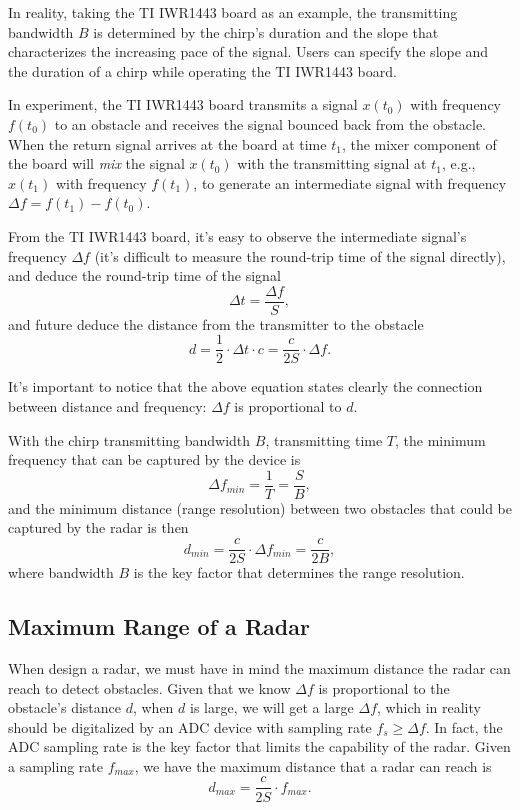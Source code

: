 \documentclass[11pt, oneside]{article}   	%
\begin{document}
In reality, taking the TI IWR1443 board as an example, the transmitting bandwidth $B$ is determined by the chirp's duration and the slope that characterizes the increasing pace of the signal. Users can specify the slope and the duration of a chirp while operating the TI IWR1443 board.

In experiment, the TI IWR1443 board transmits a signal $x(t_0)$ with frequency $f(t_0)$ to an obstacle and receives the signal bounced back from the obstacle. When the return signal arrives at the board at time $t_1$, the mixer component of the board will \emph{mix} the signal $x(t_0)$ with the transmitting signal at $t_1$, e.g., $x(t_1)$ with frequency $f(t_1)$, to generate an intermediate signal with frequency $\Delta f = f(t_1) - f(t_0)$. 

From the TI IWR1443 board, it's easy to observe the intermediate signal's frequency $\Delta f$ (it's difficult to measure the round-trip time of the signal directly), and deduce the round-trip time of the signal 
$$\Delta t = \frac{\Delta f}{S},$$
and future deduce the distance from the transmitter to the obstacle 
$$d = \frac{1}{2}\cdot \Delta t \cdot c = \frac{c}{2S}\cdot \Delta f.$$

It's important to notice that the above equation states clearly the connection between distance and frequency: $\Delta f$ is proportional to $d$.

With the chirp transmitting bandwidth $B$, transmitting time $T$, the minimum frequency that can be captured by the device is 
$$\Delta f_{min} = \frac{1}{T} = \frac{S}{B}, $$ and the minimum distance (range resolution) between two obstacles that could be captured by the radar is then 
$$d_{min} = \frac{c}{2S}\cdot \Delta f_{min} = \frac{c}{2B},$$
where bandwidth $B$ is the key factor that determines the range resolution.

\subsection{Maximum Range of a Radar}
When design a radar, we must have in mind the maximum distance the radar can reach to detect obstacles. Given that we know $\Delta f$ is proportional to the obstacle's distance $d$, when $d$ is large, we will get a large $\Delta f$,  which in reality should be digitalized by an ADC device with sampling rate $f_s \ge \Delta f$. In fact, the ADC sampling rate is the key factor that limits the capability of the radar. Given a sampling rate $f_{max}$, we have the maximum distance that a radar can reach is 
$$d_{max} = \frac{c}{2S}\cdot  f_{max}.$$
\end{document}
